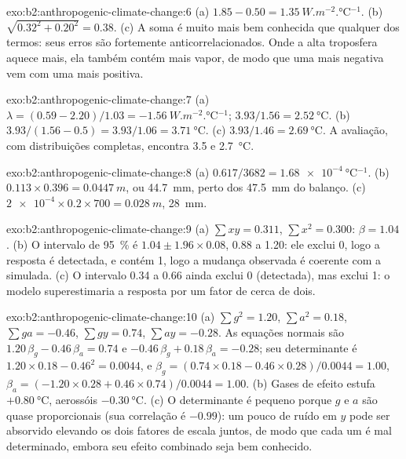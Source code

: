 \begin{solution}{exo:b2:anthropogenic-climate-change:6}
(a) $1.85 - 0.50 = \qty{1.35}{W.m^{-2}.\celsius^{-1}}$. (b) $\sqrt{0.32^2 + 0.20^2} = 0.38$.
(c) A soma é muito mais bem conhecida que qualquer dos termos: seus erros são fortemente anticorrelacionados. Onde
a alta troposfera aquece mais, ela também contém mais vapor, de modo que uma 
mais negativa vem com uma  mais positiva.
\end{solution}

\begin{solution}{exo:b2:anthropogenic-climate-change:7}
(a) $\lambda = (0.59 - 2.20)/1.03 = \qty{-1.56}{W.m^{-2}.\celsius^{-1}}$; $3.93/1.56 =
\qty{2.52}{\celsius}$. (b) $3.93/(1.56 - 0.5) = 3.93/1.06 = \qty{3.71}{\celsius}$. (c) $3.93/1.46 =
\qty{2.69}{\celsius}$. A avaliação, com distribuições completas, encontra 3.5 e \qty{2.7}{\celsius}.
\end{solution}

\begin{solution}{exo:b2:anthropogenic-climate-change:8}
(a) $0.617/3682 = \qty{1.68e-4}{\celsius^{-1}}$. (b) $0.113 \times 0.396 = \qty{0.0447}{m}$, ou
\qty{44.7}{mm}, perto dos \qty{47.5}{mm} do balanço. (c) $\num{2e-4} \times 0.2 \times 700 =
\qty{0.028}{m}$, \qty{28}{mm}.
\end{solution}

\begin{solution}{exo:b2:anthropogenic-climate-change:9}
(a) $\sum xy = 0.311$, $\sum x^2 = 0.300$: $\beta = 1.04$. (b) O intervalo de \qty{95}{\percent} é
$1.04 \pm 1.96 \times 0.08$, 0.88 a 1.20: ele exclui 0, logo a resposta é detectada, e contém
1, logo a mudança observada é coerente com a simulada. (c) O intervalo 0.34 a 0.66 ainda
exclui 0 (detectada), mas exclui 1: o modelo superestimaria a resposta por um fator de cerca
de dois.
\end{solution}

\begin{solution}{exo:b2:anthropogenic-climate-change:10}
(a) $\sum g^2 = 1.20$, $\sum a^2 = 0.18$, $\sum ga = -0.46$, $\sum gy = 0.74$, $\sum ay = -0.28$.
As equações normais são $1.20\,\beta_g - 0.46\,\beta_a = 0.74$ e $-0.46\,\beta_g + 0.18\,\beta_a
= -0.28$; seu determinante é $1.20 \times 0.18 - 0.46^2 = 0.0044$, e $\beta_g = (0.74 \times
0.18 - 0.46 \times 0.28)/0.0044 = 1.00$, $\beta_a = (-1.20 \times 0.28 + 0.46 \times 0.74)/0.0044 =
1.00$. (b) Gases de efeito estufa $+\qty{0.80}{\celsius}$, aerossóis $-\qty{0.30}{\celsius}$. (c) O
determinante é pequeno porque $g$ e $a$ são quase proporcionais (sua correlação é $-0.99$): um
pouco de ruído em $y$ pode ser absorvido elevando os dois fatores de escala juntos, de modo que cada um é mal
determinado, embora seu efeito combinado seja bem conhecido.
\end{solution}

